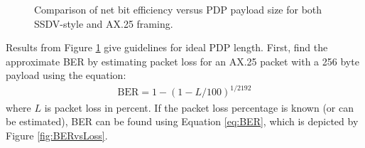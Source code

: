 \documentclass[letterpaper]{article}
\begin{document}
\begin{figure}[tbp]

\caption{Comparison of net bit efficiency versus PDP payload size for both SSDV-style and AX.25 framing.}\label{fig:EfficiencyVsPDP}
\end{figure}

Results from Figure \ref{fig:EfficiencyVsPDP} give guidelines for ideal PDP length.  First, find the approximate BER by estimating packet loss for an AX.25 packet with a 256 byte payload using the equation:
\begin{align}
    \text{BER}= 1-(1-L/100)^{1/2192}\label{eq:BER}
\end{align}
where $L$ is packet loss in percent. If the packet loss percentage is known (or can be estimated), BER can be found using Equation \ref{eq:BER}, which is depicted by Figure \ref{fig:BERvsLoss}.

\end{document}
